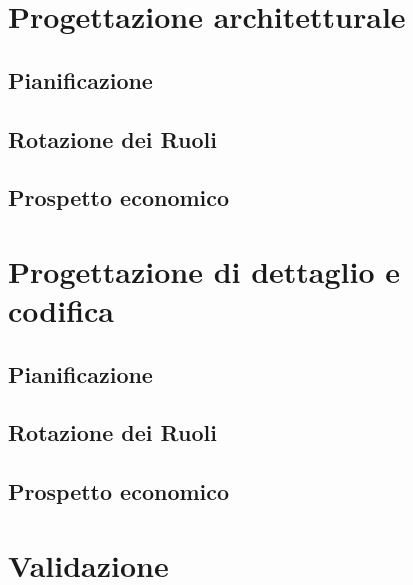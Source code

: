 \documentclass[12pt,a4paper]{article}
\begin{document}
\newpage
\section{Progettazione architetturale} %

\subsection{Pianificazione}

\subsection{Rotazione dei Ruoli}

\subsection{Prospetto economico}

\newpage
\section{Progettazione di dettaglio e codifica} %

\subsection{Pianificazione}

\subsection{Rotazione dei Ruoli}

\subsection{Prospetto economico}

\newpage
\section{Validazione} %
\end{document}
